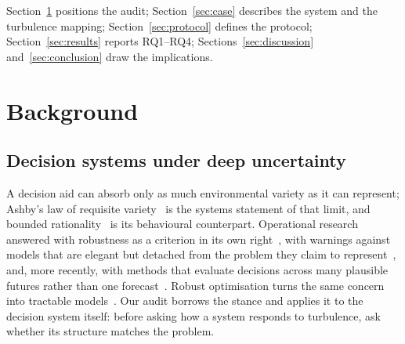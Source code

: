 \documentclass[systems,article,submit,moreauthors,pdftex]{Definitions/mdpi}
\begin{document}
Section~\ref{sec:background} positions the audit; Section~\ref{sec:case} describes the
system and the turbulence mapping; Section~\ref{sec:protocol} defines the protocol;
Section~\ref{sec:results} reports RQ1--RQ4; Sections~\ref{sec:discussion}
and~\ref{sec:conclusion} draw the implications.

\section{Background}\label{sec:background}

\subsection{Decision systems under deep uncertainty}
A decision aid can absorb only as much environmental variety as it can represent; Ashby's
law of requisite variety~\cite{ashby1956cybernetics} is the systems statement of that
limit, and bounded rationality~\cite{simon1955behavioral} is its behavioural counterpart.
Operational research answered with robustness as a criterion in its own
right~\cite{rosenhead1972robustness}, with warnings against models that are elegant but
detached from the problem they claim to represent~\cite{ackoff1979future}, and, more
recently, with methods that evaluate decisions across many plausible futures rather than
one forecast~\cite{lempert2006robust,walker2003uncertainty,marchau2019deep}. Robust
optimisation turns the same concern into tractable models~\cite{bental2002robust,bertsimas2004price}.
Our audit borrows the stance and applies it to the decision system itself: before asking
how a system responds to turbulence, ask whether its structure matches the problem.
\end{document}
